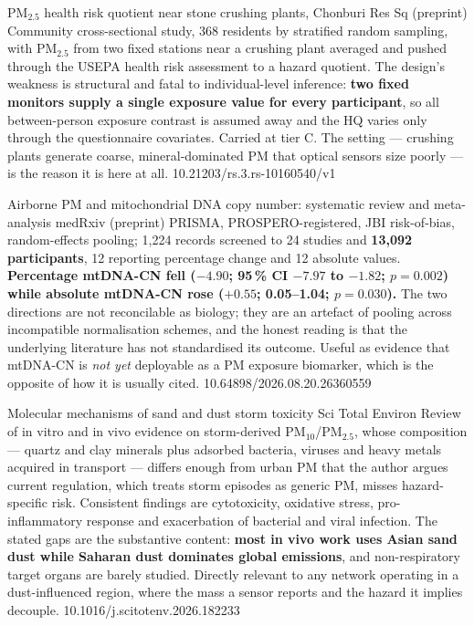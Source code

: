 \documentclass[10pt]{article}
\begin{document}
{PM$_{2.5}$ health risk quotient near stone crushing plants, Chonburi}
{Res Sq (preprint)}
{Community cross-sectional study, 368 residents by stratified random sampling, with
PM$_{2.5}$ from two fixed stations near a crushing plant averaged and pushed through the
USEPA health risk assessment to a hazard quotient. The design's weakness is structural
and fatal to individual-level inference: \textbf{two fixed monitors supply a single
exposure value for every participant}, so all between-person exposure contrast is
assumed away and the HQ varies only through the questionnaire covariates. Carried at
tier C. The setting --- crushing plants generate coarse, mineral-dominated PM that
optical sensors size poorly --- is the reason it is here at all.}
{10.21203/rs.3.rs-10160540/v1}

\clearpage


{Airborne PM and mitochondrial DNA copy number: systematic review and meta-analysis}
{medRxiv (preprint)}
{PRISMA, PROSPERO-registered, JBI risk-of-bias, random-effects pooling; 1,224 records
screened to 24 studies and \textbf{13,092 participants}, 12 reporting percentage change
and 12 absolute values. \textbf{Percentage mtDNA-CN fell ($-4.90$; 95\,\% CI $-7.97$ to
$-1.82$; $p=0.002$) while absolute mtDNA-CN rose ($+0.55$; 0.05--1.04; $p=0.030$).}
The two directions are not reconcilable as biology; they are an artefact of pooling
across incompatible normalisation schemes, and the honest reading is that the
underlying literature has not standardised its outcome. Useful as evidence that
mtDNA-CN is \emph{not yet} deployable as a PM exposure biomarker, which is the opposite
of how it is usually cited.}
{10.64898/2026.08.20.26360559}

{Molecular mechanisms of sand and dust storm toxicity}
{Sci Total Environ}
{Review of in vitro and in vivo evidence on storm-derived PM$_{10}$/PM$_{2.5}$, whose
composition --- quartz and clay minerals plus adsorbed bacteria, viruses and heavy
metals acquired in transport --- differs enough from urban PM that the author argues
current regulation, which treats storm episodes as generic PM, misses hazard-specific
risk. Consistent findings are cytotoxicity, oxidative stress, pro-inflammatory response
and exacerbation of bacterial and viral infection. The stated gaps are the substantive
content: \textbf{most in vivo work uses Asian sand dust while Saharan dust dominates
global emissions}, and non-respiratory target organs are barely studied. Directly
relevant to any network operating in a dust-influenced region, where the mass a sensor
reports and the hazard it implies decouple.}
{10.1016/j.scitotenv.2026.182233}
\end{document}
